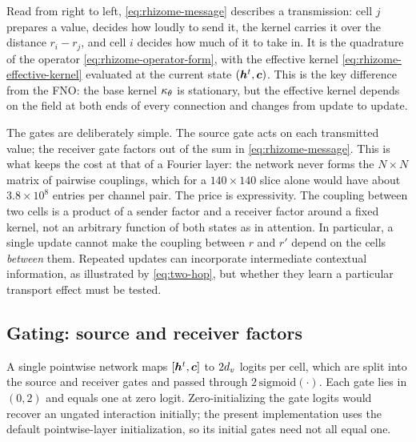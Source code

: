 Read from right to left, \cref{eq:rhizome-message} describes a transmission: cell $j$ prepares a value, decides how loudly to send it, the kernel carries it over the distance $r_i-r_j$, and cell $i$ decides how much of it to take in. It is the quadrature of the operator \cref{eq:rhizome-operator-form}, with the effective kernel \cref{eq:rhizome-effective-kernel} evaluated at the current state $(\bm{h}^t,\bm{c})$. This is the key difference from the FNO: the base kernel $\kappa_\theta$ is stationary, but the effective kernel depends on the field at both ends of every connection and changes from update to update.

The gates are deliberately simple. The source gate acts on each transmitted value; the receiver gate factors out of the sum in \cref{eq:rhizome-message}. This is what keeps the cost at that of a Fourier layer: the network never forms the $N\times N$ matrix of pairwise couplings, which for a $140\times140$ slice alone would have about $3.8\times10^8$ entries per channel pair. The price is expressivity. The coupling between two cells is a product of a sender factor and a receiver factor around a fixed kernel, not an arbitrary function of both states as in attention. In particular, a single update cannot make the coupling between $r$ and $r'$ depend on the cells \emph{between} them. Repeated updates can incorporate intermediate contextual information, as illustrated by \cref{eq:two-hop}, but whether they learn a particular transport effect must be tested.

\subsection{Gating: source and receiver factors}
\label{sec:rhizome-gates}

A single pointwise network maps $[\bm{h}^t,\bm{c}]$ to $2d_v$ logits per cell, which are split into the source and receiver gates and passed through $2\,\mathrm{sigmoid}(\cdot)$. Each gate lies in $(0,2)$ and equals one at zero logit. Zero-initializing the gate logits would recover an ungated interaction initially; the present implementation uses the default pointwise-layer initialization, so its initial gates need not all equal one.

